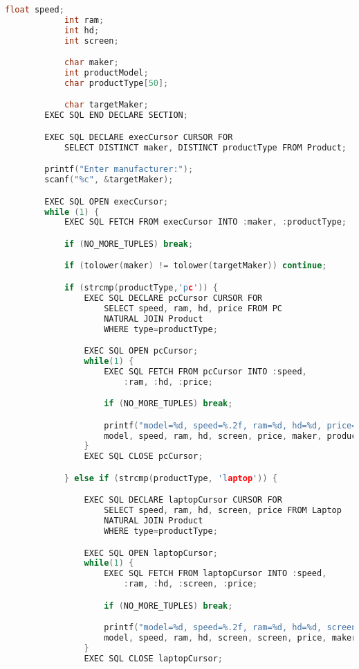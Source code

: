 \documentclass[12pt]{article}
\begin{document}
\begin{enumerate}[1.]
\begin{enumerate}[a)]
\begin{lstlisting}[language=c]
            float speed;
            int ram;
            int hd;
            int screen;

            char maker;
            int productModel;
            char productType[50];

            char targetMaker;
        EXEC SQL END DECLARE SECTION;

        EXEC SQL DECLARE execCursor CURSOR FOR
            SELECT DISTINCT maker, DISTINCT productType FROM Product;

        printf("Enter manufacturer:");
        scanf("%c", &targetMaker);

        EXEC SQL OPEN execCursor;
        while (1) {
            EXEC SQL FETCH FROM execCursor INTO :maker, :productType;

            if (NO_MORE_TUPLES) break;

            if (tolower(maker) != tolower(targetMaker)) continue;

            if (strcmp(productType,'pc')) {
                EXEC SQL DECLARE pcCursor CURSOR FOR
                    SELECT speed, ram, hd, price FROM PC
                    NATURAL JOIN Product
                    WHERE type=productType;

                EXEC SQL OPEN pcCursor;
                while(1) {
                    EXEC SQL FETCH FROM pcCursor INTO :speed,
                        :ram, :hd, :price;

                    if (NO_MORE_TUPLES) break;

                    printf("model=%d, speed=%.2f, ram=%d, hd=%d, price=%.2f, maker=%c, type=%s",
                    model, speed, ram, hd, screen, price, maker, productType);
                }
                EXEC SQL CLOSE pcCursor;

            } else if (strcmp(productType, 'laptop')) {

                EXEC SQL DECLARE laptopCursor CURSOR FOR
                    SELECT speed, ram, hd, screen, price FROM Laptop
                    NATURAL JOIN Product
                    WHERE type=productType;

                EXEC SQL OPEN laptopCursor;
                while(1) {
                    EXEC SQL FETCH FROM laptopCursor INTO :speed,
                        :ram, :hd, :screen, :price;

                    if (NO_MORE_TUPLES) break;

                    printf("model=%d, speed=%.2f, ram=%d, hd=%d, screen=%d, price=%.2f, maker=%c, type=%s",
                    model, speed, ram, hd, screen, screen, price, maker, productType);
                }
                EXEC SQL CLOSE laptopCursor;



\end{lstlisting}
\end{enumerate}
\end{enumerate}
\end{document}
